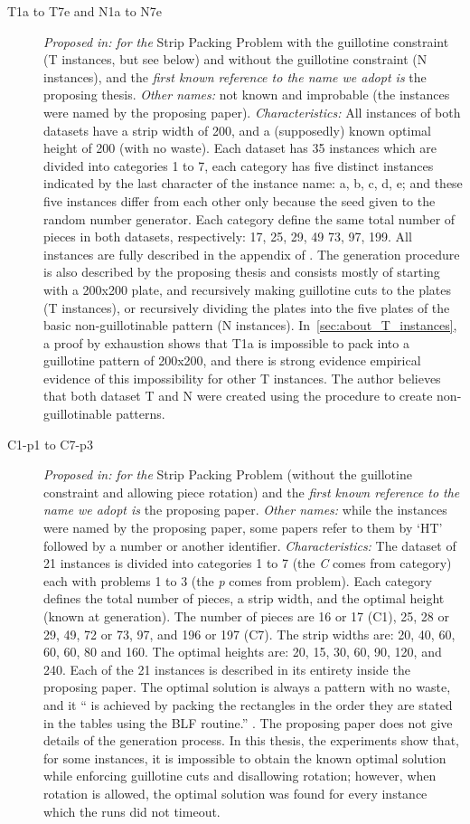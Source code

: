 \documentclass[ppgc,tese,english,formais,babel]{iiufrgs}
\begin{document}
\begin{description}
\item [T1a to T7e and N1a to N7e] \emph{Proposed in:} \citet{hopper_thesis} \emph{for the} Strip Packing Problem with the guillotine constraint (T instances, but see below) and without the guillotine constraint (N instances), and the \emph{first known reference to the name we adopt is} the proposing thesis. \emph{Other names:} not known and improbable (the instances were named by the proposing paper). \emph{Characteristics: } All instances of both datasets have a strip width of 200, and a (supposedly) known optimal height of 200 (with no waste). Each dataset has 35 instances which are divided into categories 1 to 7, each category has five distinct instances indicated by the last character of the instance name: a, b, c, d, e; and these five instances differ from each other only because the seed given to the random number generator. Each category define the same total number of pieces in both datasets, respectively: 17, 25, 29, 49 73, 97, 199. All instances are fully described in the appendix of \citet{hopper_thesis}. The generation procedure is also described by the proposing thesis and consists mostly of starting with a 200x200 plate, and recursively making guillotine cuts to the plates (T instances), or recursively dividing the plates into the five plates of the basic non-guillotinable pattern (N instances). In~\cref{sec:about_T_instances}, a proof by exhaustion shows that T1a is impossible to pack into a guillotine pattern of 200x200, and there is strong evidence empirical evidence of this impossibility for other T instances. The author believes that both dataset T and N were created using the procedure to create non-guillotinable patterns.
\item[C1-p1 to C7-p3] \emph{Proposed in:} \citet{hopper:2001} \emph{for the} Strip Packing Problem (without the guillotine constraint and allowing piece rotation) and the \emph{first known reference to the name we adopt is} the proposing paper. \emph{Other names:} while the instances were named by the proposing paper, some papers refer to them by `HT' followed by a number or another identifier\cite{stephane:sat:2010,fleszar:2016}. \emph{Characteristics:} The dataset of 21 instances is divided into categories 1 to 7 (the \emph{C} comes from category) each with problems 1 to 3 (the \emph{p} comes from problem). Each category defines the total number of pieces, a strip width, and the optimal height (known at generation). The number of pieces are 16 or 17 (C1), 25, 28 or 29, 49, 72 or 73, 97, and 196 or 197 (C7). The strip widths are: 20, 40, 60, 60, 60, 80 and 160. The optimal heights are: 20, 15, 30, 60, 90, 120, and 240. Each of the 21 instances is described in its entirety inside the proposing paper. The optimal solution is always a pattern with no waste, and it `` is achieved by packing the rectangles in the order they are stated in the tables using the BLF routine.'' \citep{hopper:2001}. The proposing paper does not give details of the generation process. In this thesis, the experiments show that, for some instances, it is impossible to obtain the known optimal solution while enforcing guillotine cuts and disallowing rotation; however, when rotation is allowed, the optimal solution was found for every instance which the runs did not timeout.

\end{description}
\end{document}
